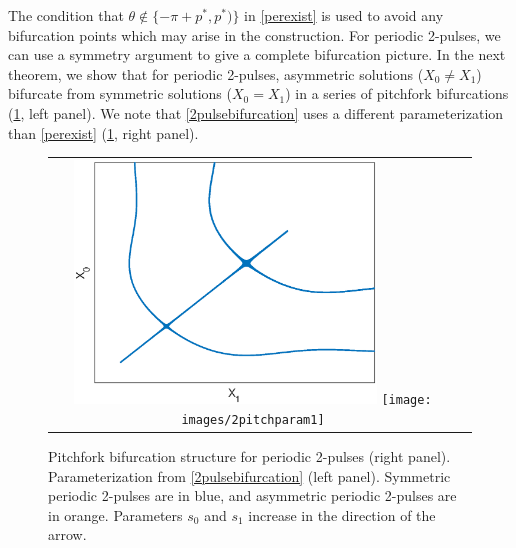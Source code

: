 \documentclass[11pt,reqno]{amsart}
\theoremstyle{plain}
\theoremstyle{definition}
\theoremstyle{remark}
\begin{document}
The condition that $\theta \notin \{-\pi + p^*, p^*) \}$ in \cref{perexist} is used to avoid any bifurcation points which may arise in the construction. For periodic 2-pulses, we can use a symmetry argument to give a complete bifurcation picture. In the next theorem, we show that for periodic 2-pulses, asymmetric solutions ($X_0 \neq X_1$) bifurcate from symmetric solutions ($X_0 = X_1$) in a series of pitchfork bifurcations (\cref{fig:2pitch}, left panel). We note that \cref{2pulsebifurcation} uses a different parameterization than \cref{perexist} (\cref{fig:2pitch}, right panel).

\begin{figure}
\begin{center}
\begin{tabular}{cc}
\includegraphics[width=8cm]{images/2pitchfork.eps}
\texttt{[image: images/2pitchparam1]}
\end{tabular}
\end{center}
\caption[Pitchfork bifurcation structure for periodic 2-pulses]{Pitchfork bifurcation structure for periodic 2-pulses (right panel). Parameterization from \cref{2pulsebifurcation} (left panel). Symmetric periodic 2-pulses are in blue, and asymmetric periodic 2-pulses are in orange. Parameters $s_0$ and $s_1$ increase in the direction of the arrow.}
\label{fig:2pitch}
\end{figure} 
\end{document}
